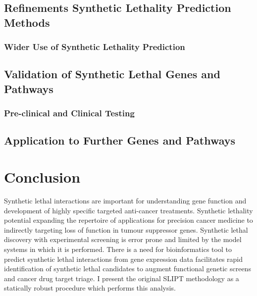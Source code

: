 \subsection{Refinements Synthetic Lethality Prediction Methods}
\label{chapt6:future_slipt_method}


\subsubsection{Wider Use of Synthetic Lethality Prediction}
\label{chapt6:future_slipt_data}


\subsection{Validation of Synthetic Lethal Genes and Pathways}
\label{chapt6:future_cdh1}

\subsubsection{Pre-clinical and Clinical Testing}
\label{chapt6:future_clinic}

\subsection{Application to Further Genes and Pathways}
\label{chapt6:future_slipt}

\clearpage
\section{Conclusion}
\label{chap:conclusion}

Synthetic lethal interactions are important for understanding gene function and development of highly specific targeted anti-cancer treatments. Synthetic lethality potential expanding the repertoire of applications for precision cancer medicine to indirectly targeting loss of function in tumour suppressor genes.  Synthetic lethal discovery with experimental screening is error prone and limited by the model systems in which it is performed.  There is a need for bioinformatics tool to predict synthetic lethal interactions from gene expression data facilitates rapid identification of synthetic lethal candidates to augment functional genetic screens and cancer drug target triage. I present the original \acrfull{SLIPT} methodology as a statically robust procedure which performs this analysis.

